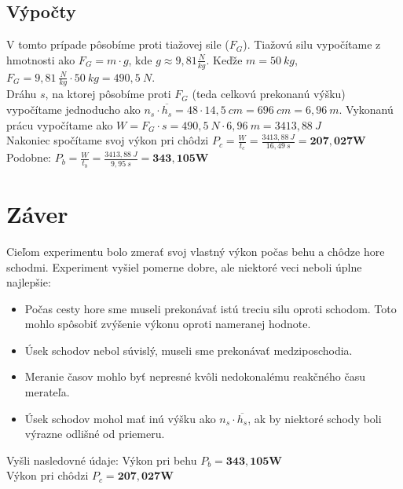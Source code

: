 \documentclass{article}
\begin{document}
\subsection{Výpočty}
V tomto prípade pôsobíme proti tiažovej sile ($F_G$). Tiažovú silu vypočítame z hmotnosti ako $F_G = m\cdot g$, kde $g\approx 9,81 \frac{N}{kg}$.
Keďže $m=50\ kg$, $F_G = 9,81\ \frac{N}{kg}\cdot 50\ kg = 490,5\ N$.\\
Dráhu $s$, na ktorej pôsobíme proti $F_G$ (teda celkovú prekonanú výšku) vypočítame jednoducho ako $n_s\cdot\overline{h_s} = 48 \cdot 14,5\ cm = 696\ cm = 6,96\ m$.
Vykonanú prácu vypočítame ako $W = F_G\cdot s = 490,5\ N \cdot 6,96\ m = 3413,88\ J$\\
Nakoniec spočítame svoj výkon pri chôdzi $P_c = \frac{W}{t_c} = \frac{3413,88\ J}{16,49\ s}=\mathbf{207,027 W}$\\
Podobne: $P_b = \frac{W}{t_b} = \frac{3413,88\ J}{9,95\ s} = \mathbf{343,105 W}$\\
\section{Záver}
Cieľom experimentu bolo zmerať svoj vlastný výkon počas behu a chôdze hore schodmi. Experiment vyšiel pomerne dobre, ale niektoré veci neboli úplne najlepšie:
\begin{itemize}
	\item Počas cesty hore sme museli prekonávať istú treciu silu oproti schodom. Toto mohlo spôsobiť zvýšenie výkonu oproti nameranej hodnote.
	\item Úsek schodov nebol súvislý, museli sme prekonávať medziposchodia.
	\item Meranie časov mohlo byť nepresné kvôli nedokonalému reakčného času merateľa.
	\item Úsek schodov mohol mať inú výšku ako $n_s\cdot\overline{h_s}$, ak by niektoré schody boli výrazne odlišné od priemeru.
\end{itemize}
Vyšli nasledovné údaje:
Výkon pri behu $P_b = \mathbf{343,105 W}$\\
Výkon pri chôdzi $P_c = \mathbf{207,027 W}$
\end{document}

